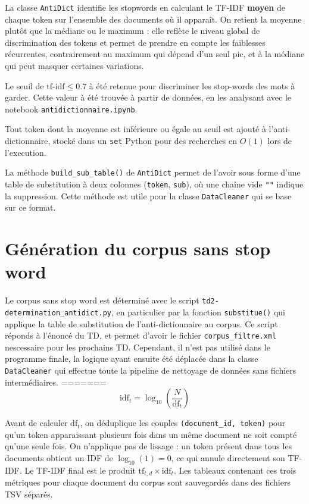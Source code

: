 La classe \texttt{AntiDict} identifie les stopwords en calculant le TF-IDF \textbf{moyen} de chaque token sur l'ensemble des documents où il apparaît. On retient la moyenne plutôt que la médiane ou le maximum : elle reflète le niveau global de discrimination des tokens et permet de prendre en compte les faiblesses récurrentes, contrairement au maximum qui dépend d'un seul pic, et à la médiane qui peut masquer certaines variations. 

Le seuil de $\text{tf-idf} \le 0.7$ à été retenue pour discriminer les stop-words des mots à garder. Cette valeur à été trouvée à partir de données, en les analysant avec le notebook \texttt{antidictionnaire.ipynb}.
 
Tout token dont la moyenne est inférieure ou égale au seuil est ajouté à l'anti-dictionnaire, stocké dans un \texttt{set} Python pour des recherches en $O(1)$ lors de l'execution.

La méthode \texttt{build\_sub\_table()} de \texttt{AntiDict} permet de l'avoir sous forme d'une table de substitution à deux colonnes (\texttt{token}, \texttt{sub}), où une chaîne vide \texttt{""} indique la suppression. Cette méthode est utile pour la classe \texttt{DataCleaner} qui se base sur ce format.

\section{Génération du corpus sans stop word}

Le corpus sans stop word est déterminé avec le script \texttt{td2-determination\_antidict.py}, en particulier par la fonction \texttt{substitue()} qui applique la table de substitution de l'anti-dictionnaire au corpus. Ce script réponds à l'énoncé du TD, et permet d'avoir le fichier \texttt{corpus\_filtre.xml} nescessaire pour les prochains TD. Cependant, il n'est pas utilisé dans le programme finale, la logique ayant ensuite été déplacée dans la classe \texttt{DataCleaner} qui effectue toute la pipeline de nettoyage de données sans fichiers intermédiaires.  
=======
\[
    \text{idf}_t = \log_{10}\!\left(\frac{N}{\text{df}_t}\right)
\]

Avant de calculer $\text{df}_t$, on déduplique les couples \texttt{(document\_id, token)} pour qu'un token apparaissant plusieurs fois dans un même document ne soit compté qu'une seule fois. On n'applique pas de lissage : un token présent dans tous les documents obtient un IDF de $\log_{10}(1) = 0$, ce qui annule directement son TF-IDF. Le TF-IDF final est le produit $\text{tf}_{t,d} \times \text{idf}_t$. Les tableaux contenant ces trois métriques pour chaque document du corpus sont sauvegardés dans des fichiers TSV séparés.
